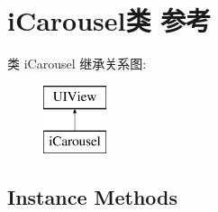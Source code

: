\hypertarget{interfacei_carousel}{\section{i\-Carousel类 参考}
\label{interfacei_carousel}
}
类 i\-Carousel 继承关系图\-:\begin{figure}[H]
\begin{center}
\leavevmode
\includegraphics[height=2.000000cm]{interfacei_carousel}
\end{center}
\end{figure}
\subsection*{Instance Methods}
